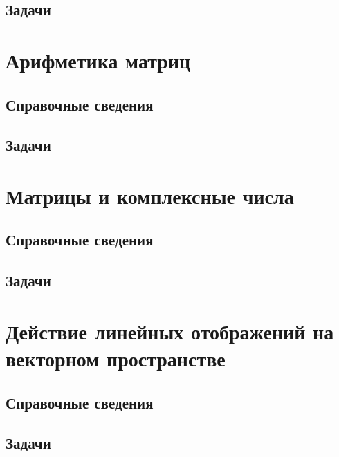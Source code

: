 \subsection*{Задачи}



\section{Арифметика матриц}

\subsection*{Справочные сведения}

\subsection*{Задачи}



\section{Матрицы и комплексные числа}

\subsection*{Справочные сведения}

\subsection*{Задачи}




\section{Действие линейных отображений на векторном пространстве}

\subsection*{Справочные сведения}

\subsection*{Задачи}



\begin{comment}
\chapter{14. Алгебраические числа}
\end{comment}


